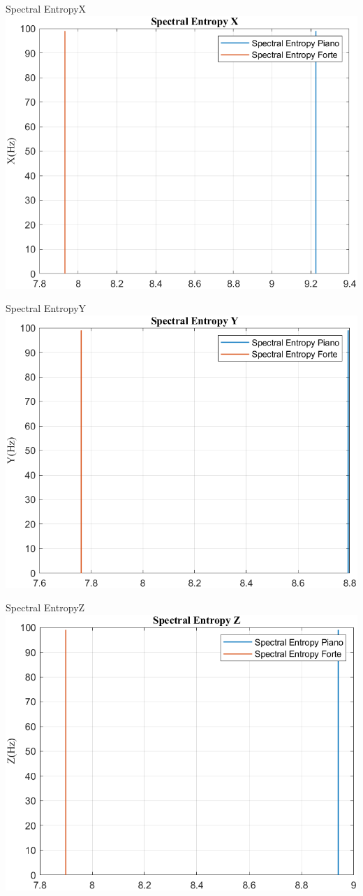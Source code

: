 \documentclass[beamer]{standalone}
\begin{document}
	\begin{frame}{{Spectral EntropyX}}
		\centering\includegraphics[height=.8\textheight]{figure/Acc/Trasformata/Spectral EntropyX}
	\end{frame}
	
	\begin{frame}{{Spectral EntropyY}}
		\centering\includegraphics[height=.8\textheight]{figure/Acc/Trasformata/Spectral EntropyY}
	\end{frame}
	
	\begin{frame}{{Spectral EntropyZ}}
		\centering\includegraphics[height=.8\textheight]{figure/Acc/Trasformata/Spectral EntropyZ}
	\end{frame}
	
\end{document}
